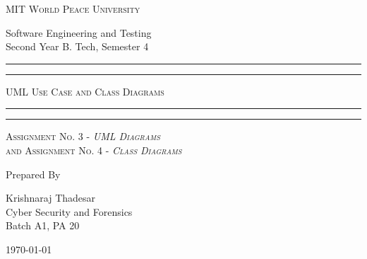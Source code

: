 \documentclass[11pt]{article}
\begin{document}
\begin{titlepage}
	\centering


	\huge\textsc{
		MIT World Peace University
	}\\

	\vspace{0.75\baselineskip} %

	\LARGE{
		Software Engineering and Testing\\
		Second Year B. Tech, Semester 4
	}

	\vfill %


	\rule{\textwidth}{1.6pt}\vspace*{-\baselineskip}\vspace*{2pt}
	\rule{\textwidth}{0.6pt}
	\vspace{0.75\baselineskip} %



	\huge{\textsc{
			UML Use Case and Class Diagrams
		}} \\



	\vspace{0.5\baselineskip} %
	\rule{\textwidth}{0.6pt}\vspace*{-\baselineskip}\vspace*{2.8pt}
	\rule{\textwidth}{1.6pt}

	\vspace{1\baselineskip} %


	\LARGE\textsc{
		\centering
		Assignment No. 3 - \textit{UML Diagrams}\\
		and Assignment No. 4 - \textit{Class Diagrams}
	} %
	\vfill


	Prepared By
	\vspace{0.5\baselineskip} %

	\Large{
		Krishnaraj Thadesar \\
		Cyber Security and Forensics\\
		Batch A1, PA 20
	}


	\vspace{0.5\baselineskip} %
	\today

\end{titlepage}
\end{document}
